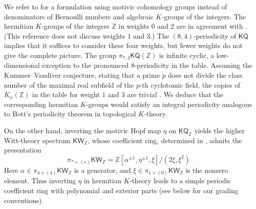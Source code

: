 \documentclass[11pt,hyp,english]{article}
\newcommand{\Z}{\mathbb{Z}}
\newcommand{\KQ}{\mathsf{KQ}}
\newcommand{\KW}{\mathsf{KW}}
\newcommand{\bideg}{(\star)}
\theoremstyle{definition}
\begin{document}
We refer to  for a formulation using motivic cohomology groups instead of 
denominators of Bernoulli numbers and algebraic $K$-groups of the integers. 
The hermitian $K$-groups of the integers $\mathbb{Z}$ in weights $0$ and $2$ are in 
agreement with \cite[Theorem 3.2.1]{9.III}. 
(This reference does not discuss weights $1$ and $3$.)
The $(8,4)$-periodicity of $\KQ$ implies that it suffices to consider these four weights, 
but fewer weights do not give the complete picture.
The group $\pi_{7,3}\KQ(\Z)$ is infinite cyclic, 
a low-dimensional exception to the pronounced $8$-periodicity in the table.
Assuming the Kummer–Vandiver conjecture, 
stating that a prime \(p\) does not divide the class number of the maximal real subfield
of the \(p\)-th cyclotomic field,
the copies of $K_n(\Z)$ in the table for weight $1$ and $3$ are trivial 
\cite{zbMATH00034713}.
We deduce that the corresponding hermitian $K$-groups would satisfy an integral 
periodicity analogous to Bott's periodicity theorem in topological $K$-theory.

On the other hand, inverting the motivic Hopf map $\eta$ on $\KQ_\Z$ yields the higher Witt-theory 
spectrum $\KW_\Z$, whose coefficient ring, determined in , admits the presentation
\[
  \pi_{\ast+\bideg}\KW_\Z = \Z[\alpha^{\pm 1},\eta^{\pm 1}, \xi]/(2\xi,\xi^2)
\]
Here $\alpha \in \pi_{4+(4)}\KW_\Z$ is a generator, and $\xi \in \pi_{1+(0)}\KW_\Z$ is the nonzero element. 
Thus inverting $\eta$ in hermitian $K$-theory leads to a simple periodic coefficient ring with polynomial and exterior parts (see below for our grading conventions).
\end{document}
